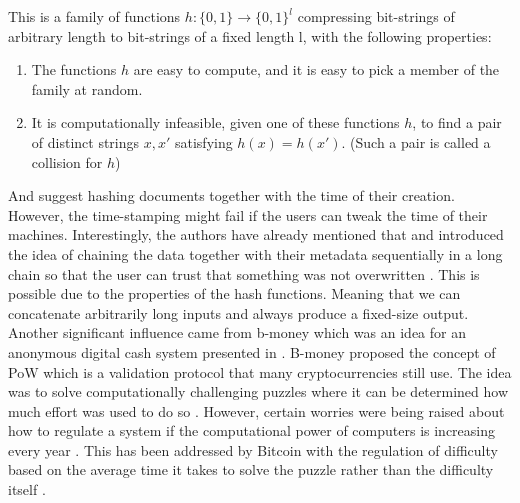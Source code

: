 \begin{defin}[Hash]\label{de:hash}
    This is a family of functions $h: \{0,1\} \rightarrow  {\{0, 1\}}^l $ compressing
bit-strings of arbitrary length to bit-strings of a fixed length l, with the following
properties:
\begin{enumerate}
    \item The functions $h$ are easy to compute, and it is easy to pick a member of the family at random.
    \item It is computationally infeasible, given one of these functions $h$, to find a pair
of distinct strings $x,x'$ satisfying $h(x)=h(x')$. (Such a pair is called a collision for $h$)\cite[see Chapter 4.1]{Haber1991}
\end{enumerate}
\end{defin}

And suggest hashing documents together with the time of their creation.
However, the time-stamping might 
fail if the users can tweak the time of their machines. Interestingly, the authors have already 
mentioned that and introduced the idea of chaining the data together with their metadata sequentially in a long chain 
so that the user can trust that something was not overwritten \cite[see Chapter 5]{Haber1991}. 
This is possible due to the properties of the hash functions.
Meaning that we can concatenate arbitrarily long inputs and always produce a fixed-size output. 
Another significant influence came from b-money which was an idea for an anonymous digital
cash system presented in \citep{Dai1998}. B-money proposed the concept of \ac{PoW}
which is a validation protocol that many cryptocurrencies still use. The idea was to solve
computationally challenging puzzles where it can be determined how much effort was used to do so
\cite[see][pg.~1]{Dai1998}.
However, certain worries were being raised about how to regulate a system if the computational power
of computers is increasing every year \cite[see][pg.~3]{Dai1998}. This has been addressed by Bitcoin
with the regulation of difficulty based on the average time it takes to solve the puzzle 
rather than the difficulty itself \cite[see][pg.~3]{Nakamoto2008}.


